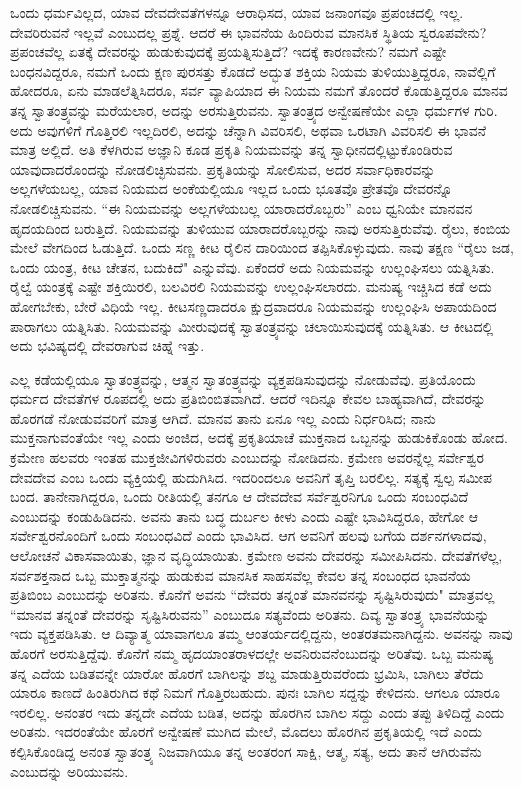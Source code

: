 ಒಂದು ಧರ್ಮವಿಲ್ಲದ, ಯಾವ ದೇವದೇವತೆಗಳನ್ನೂ ಆರಾಧಿಸದ, ಯಾವ ಜನಾಂಗವೂ ಪ್ರಪಂಚದಲ್ಲಿ ಇಲ್ಲ. ದೇವರಿರುವನೆ ಇಲ್ಲವೆ ಎಂಬುದಲ್ಲ ಪ್ರಶ್ನೆ. ಆದರೆ ಈ ಭಾವನೆಯ ಹಿಂದಿರುವ ಮಾನಸಿಕ ಸ್ಥಿತಿಯ ಸ್ವರೂಪವೇನು? ಪ್ರಪಂಚವೆಲ್ಲ ಏತಕ್ಕೆ ದೇವರನ್ನು ಹುಡುಕುವುದಕ್ಕೆ ಪ್ರಯತ್ನಿಸುತ್ತಿದೆ? ಇದಕ್ಕೆ ಕಾರಣವೇನು? ನಮಗೆ ಎಷ್ಟೇ ಬಂಧನವಿದ್ದರೂ, ನಮಗೆ ಒಂದು ಕ್ಷಣ ಪುರಸತ್ತು ಕೊಡದೆ ಅದ್ಭುತ ಶಕ್ತಿಯ ನಿಯಮ ತುಳಿಯುತ್ತಿದ್ದರೂ, ನಾವೆಲ್ಲಿಗೆ ಹೋದರೂ, ಏನು ಮಾಡಲೆತ್ನಿಸಿದರೂ, ಸರ್ವ ವ್ಯಾಪಿಯಾದ ಈ ನಿಯಮ ನಮಗೆ ತೊಂದರೆ ಕೊಡುತ್ತಿದ್ದರೂ ಮಾನವ ತನ್ನ ಸ್ವಾತಂತ್ರ್ಯವನ್ನು ಮರೆಯಲಾರ, ಅದನ್ನು ಅರಸುತ್ತಿರುವನು. ಸ್ವಾತಂತ್ರ್ಯದ ಅನ್ವೇಷಣೆಯೇ ಎಲ್ಲಾ ಧರ್ಮಗಳ ಗುರಿ. ಅದು ಅವುಗಳಿಗೆ ಗೊತ್ತಿರಲಿ ಇಲ್ಲದಿರಲಿ, ಅದನ್ನು ಚೆನ್ನಾಗಿ ವಿವರಿಸಲಿ, ಅಥವಾ ಒರಟಾಗಿ ವಿವರಿಸಲಿ ಈ ಭಾವನೆ ಮಾತ್ರ ಅಲ್ಲಿದೆ. ಅತಿ ಕೆಳಗಿರುವ ಅಜ್ಞಾನಿ ಕೂಡ ಪ್ರಕೃತಿ ನಿಯಮವನ್ನು ತನ್ನ ಸ್ವಾಧೀನದಲ್ಲಿಟ್ಟುಕೊಂಡಿರುವ ಯಾವುದಾದರೊಂದನ್ನು ನೋಡಲಿಚ್ಛಿಸುವನು. ಪ್ರಕೃತಿಯನ್ನು ಸೋಲಿಸುವ, ಅದರ ಸರ್ವಾಧಿಕಾರವನ್ನು ಅಲ್ಲಗಳೆಯಬಲ್ಲ, ಯಾವ ನಿಯಮದ ಅಂಕೆಯಲ್ಲಿಯೂ ಇಲ್ಲದ ಒಂದು ಭೂತವೊ ಪ್ರೇತವೊ ದೇವರನ್ನೊ ನೋಡಲಿಚ್ಚಿಸುವನು. “ಈ ನಿಯಮವನ್ನು ಅಲ್ಲಗಳೆಯಬಲ್ಲ ಯಾರಾದರೊಬ್ಬರು” ಎಂಬ ಧ್ವನಿಯೇ ಮಾನವನ ಹೃದಯದಿಂದ ಬರುತ್ತಿದೆ. ನಿಯಮವನ್ನು ತುಳಿಯುವ ಯಾರಾದರೊಬ್ಬರನ್ನು ನಾವು ಅರಸುತ್ತಿರುವೆವು. ರೈಲು, ಕಂಬಿಯ ಮೇಲೆ ವೇಗದಿಂದ ಓಡುತ್ತಿದೆ. ಒಂದು ಸಣ್ಣ ಕೀಟ ರೈಲಿನ ದಾರಿಯಿಂದ ತಪ್ಪಿಸಿಕೊಳ್ಳುವುದು. ನಾವು ತಕ್ಷಣ “ರೈಲು ಜಡ, ಒಂದು ಯಂತ್ರ, ಕೀಟ ಚೇತನ, ಬದುಕಿದೆ" ಎನ್ನುವೆವು. ಏಕೆಂದರೆ ಅದು ನಿಯಮವನ್ನು ಉಲ್ಲಂಘಿಸಲು ಯತ್ನಿಸಿತು. ರೈಲ್ವೆ ಯಂತ್ರಕ್ಕೆ ಎಷ್ಟೇ ಶಕ್ತಿಯಿರಲಿ, ಬಲವಿರಲಿ ನಿಯಮವನ್ನು ಉಲ್ಲಂಘಿಸಲಾರದು. ಮನುಷ್ಯ ಇಚ್ಚಿಸಿದ ಕಡೆ ಅದು ಹೋಗಬೇಕು, ಬೇರೆ ವಿಧಿಯೆ ಇಲ್ಲ. ಕೀಟಸಣ್ಣದಾದರೂ ಕ್ಷುದ್ರವಾದರೂ ನಿಯಮವನ್ನು ಉಲ್ಲಂಘಿಸಿ ಅಪಾಯದಿಂದ ಪಾರಾಗಲು ಯತ್ನಿಸಿತು. ನಿಯಮವನ್ನು ಮೀರುವುದಕ್ಕೆ ಸ್ವಾತಂತ್ರ್ಯವನ್ನು ಚಲಾಯಿಸುವುದಕ್ಕೆ ಯತ್ನಿಸಿತು. ಆ ಕೀಟದಲ್ಲಿ ಅದು ಭವಿಷ್ಯದಲ್ಲಿ ದೇವರಾಗುವ ಚಿಹ್ನೆ ಇತ್ತು.

ಎಲ್ಲ ಕಡೆಯಲ್ಲಿಯೂ ಸ್ವಾತಂತ್ರ್ಯವನ್ನು, ಆತ್ಮನ ಸ್ವಾತಂತ್ರ್ಯವನ್ನು ವ್ಯಕ್ತಪಡಿಸುವುದನ್ನು ನೋಡುವೆವು. ಪ್ರತಿಯೊಂದು ಧರ್ಮದ ದೇವತೆಗಳ ರೂಪದಲ್ಲಿ ಅದು ಪ್ರತಿಬಿಂಬಿತವಾಗಿದೆ. ಆದರೆ ಇದಿನ್ನೂ ಕೇವಲ ಬಾಹ್ಯವಾಗಿದೆ, ದೇವರನ್ನು ಹೊರಗಡೆ ನೋಡುವವರಿಗೆ ಮಾತ್ರ ಆಗಿದೆ. ಮಾನವ ತಾನು ಏನೂ ಇಲ್ಲ ಎಂದು ನಿರ್ಧರಿಸಿದ; ನಾನು ಮುಕ್ತನಾಗುವಂತೆಯೇ ಇಲ್ಲ ಎಂದು ಅಂಜಿದ, ಅದಕ್ಕೆ ಪ್ರಕೃತಿಯಾಚೆ ಮುಕ್ತನಾದ ಒಬ್ಬನನ್ನು ಹುಡುಕಿಕೊಂಡು ಹೋದ. ಕ್ರಮೇಣ ಹಲವರು ಇಂತಹ ಮುಕ್ತಜೀವಿಗಳಿರುವರು ಎಂಬುದನ್ನು ನೋಡಿದನು. ಕ್ರಮೇಣ ಅವರನ್ನೆಲ್ಲ ಸರ್ವೇಶ್ವರ ದೇವದೇವ ಎಂಬ ಒಂದು ವ್ಯಕ್ತಿಯಲ್ಲಿ ಹುದುಗಿಸಿದ. ಇದರಿಂದಲೂ ಅವನಿಗೆ ತೃಪ್ತಿ ಬರಲಿಲ್ಲ. ಸತ್ಯಕ್ಕೆ ಸ್ವಲ್ಪ ಸಮೀಪ ಬಂದ. ತಾನೇನಾಗಿದ್ದರೂ, ಒಂದು ರೀತಿಯಲ್ಲಿ ತನಗೂ ಆ ದೇವದೇವ ಸರ್ವೆಶ್ವರನಿಗೂ ಒಂದು ಸಂಬಂಧವಿದೆ ಎಂಬುದನ್ನು ಕಂಡುಹಿಡಿದನು. ಅವನು ತಾನು ಬದ್ಧ ದುರ್ಬಲ ಕೀಳು ಎಂದು ಎಷ್ಟೇ ಭಾವಿಸಿದ್ದರೂ, ಹೇಗೋ ಆ ಸರ್ವೇಶ್ವರನೊಂದಿಗೆ ಒಂದು ಸಂಬಂಧವಿದೆ ಎಂದು ಭಾವಿಸಿದ. ಆಗ ಅವನಿಗೆ ಹಲವು ಬಗೆಯ ದರ್ಶನಗಳಾದವು, ಆಲೋಚನೆ ವಿಕಾಸವಾಯಿತು, ಜ್ಞಾನ ವೃದ್ಧಿಯಾಯಿತು. ಕ್ರಮೇಣ ಅವನು ದೇವರನ್ನು ಸಮೀಪಿಸಿದನು. ದೇವತೆಗಳೆಲ್ಲ, ಸರ್ವಶಕ್ತನಾದ ಒಬ್ಬ ಮುಕ್ತಾತ್ಮನನ್ನು ಹುಡುಕುವ ಮಾನಸಿಕ ಸಾಹಸವೆಲ್ಲ ಕೇವಲ ತನ್ನ ಸಂಬಂಧದ ಭಾವನೆಯ ಪ್ರತಿಬಿಂಬ ಎಂಬುದನ್ನು ಅರಿತನು. ಕೊನೆಗೆ ಅವನು “ದೇವರು ತನ್ನಂತೆ ಮಾನವನನ್ನು ಸೃಷ್ಟಿಸಿರುವುದು" ಮಾತ್ರವಲ್ಲ “ಮಾನವ ತನ್ನಂತೆ ದೇವರನ್ನು ಸೃಷ್ಟಿಸಿರುವನು” ಎಂಬುದೂ ಸತ್ಯವೆಂದು ಅರಿತನು. ದಿವ್ಯ ಸ್ವಾತಂತ್ರ್ಯ ಭಾವನೆಯನ್ನು ಇದು ವ್ಯಕ್ತಪಡಿಸಿತು. ಆ ದಿವ್ಯಾತ್ಮ ಯಾವಾಗಲೂ ತಮ್ಮ ಆಂತರ್ಯದಲ್ಲಿದ್ದನು, ಅಂತರತಮನಾಗಿದ್ದನು. ಅವನನ್ನು ನಾವು ಹೊರಗೆ ಅರಸುತ್ತಿದ್ದೆವು. ಕೊನೆಗೆ ನಮ್ಮ ಹೃದಯಾಂತರಾಳದಲ್ಲೇ ಅವನಿರುವನೆಂಬುದನ್ನು ಅರಿತೆವು. ಒಬ್ಬ ಮನುಷ್ಯ ತನ್ನ ಎದೆಯ ಬಡಿತವನ್ನೇ ಯಾರೋ ಹೊರಗೆ ಬಾಗಿಲನ್ನು ಶಬ್ದ ಮಾಡುತ್ತಿರುವರೆಂದು ಭ್ರಮಿಸಿ, ಬಾಗಿಲು ತೆರೆದು ಯಾರೂ ಕಾಣದೆ ಹಿಂತಿರುಗಿದ ಕಥೆ ನಿಮಗೆ ಗೊತ್ತಿರಬಹುದು. ಪುನಃ ಬಾಗಿಲ ಸದ್ದನ್ನು ಕೇಳಿದನು. ಆಗಲೂ ಯಾರೂ ಇರಲಿಲ್ಲ. ಅನಂತರ ಇದು ತನ್ನದೇ ಎದೆಯ ಬಡಿತ, ಅದನ್ನು ಹೊರಗಿನ ಬಾಗಿಲ ಸದ್ದು ಎಂದು ತಪ್ಪು ತಿಳಿದಿದ್ದೆ ಎಂದು ಅರಿತನು. ಇದರಂತೆಯೇ ಹೊರಗೆ ಅನ್ವೇಷಣೆ ಮುಗಿದ ಮೇಲೆ, ಮೊದಲು ಹೊರಗಿನ ಪ್ರಕೃತಿಯಲ್ಲಿ ಇದೆ ಎಂದು ಕಲ್ಪಿಸಿಕೊಂಡಿದ್ದ ಅನಂತ ಸ್ವಾತಂತ್ರ್ಯ ನಿಜವಾಗಿಯೂ ತನ್ನ ಅಂತರಂಗ ಸಾಕ್ಷಿ, ಆತ್ಮ, ಸತ್ಯ, ಅದು ತಾನೆ ಆಗಿರುವೆನು ಎಂಬುದನ್ನು ಅರಿಯುವನು.

